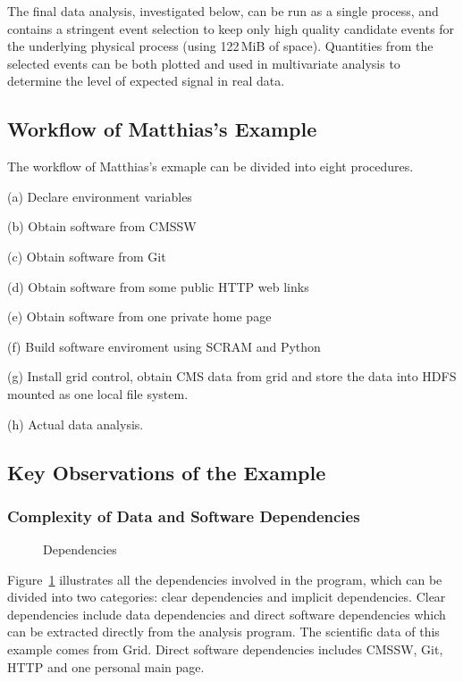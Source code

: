 \documentclass{acm_proc_article-sp}
\begin{document}
The final data analysis, investigated below, can be run as a single
process, and contains a stringent event selection to keep only high
quality candidate events for the underlying physical process (using
122$\,$MiB of space).  Quantities from the selected events can be
both plotted and used in multivariate analysis to determine the level
of expected signal in real data.


\subsection{Workflow of Matthias's Example}

The workflow of Matthias's exmaple can be divided into eight procedures.

(a) Declare environment variables

(b) Obtain software from CMSSW

(c) Obtain software from Git

(d) Obtain software from some public HTTP web links

(e) Obtain software from one private home page

(f) Build software enviroment using SCRAM and Python

(g) Install grid control, obtain CMS data from grid and store the data into HDFS mounted as one local file system.

(h) Actual data analysis.

\subsection{Key Observations of the Example}

\subsubsection{Complexity of Data and Software Dependencies}

\begin{figure}
\centering
{}
\caption{Dependencies}
\label{fig:dependencies}
\end{figure}

Figure~\ref{fig:dependencies} illustrates all the dependencies
involved in the program, which can be divided into two categories: clear
dependencies and implicit dependencies. Clear dependencies include data
dependencies and direct software dependencies which can be extracted directly
from the analysis program. The scientific data of this example comes from Grid. Direct software dependencies includes CMSSW, Git, HTTP and one personal main page. 
\end{document}
